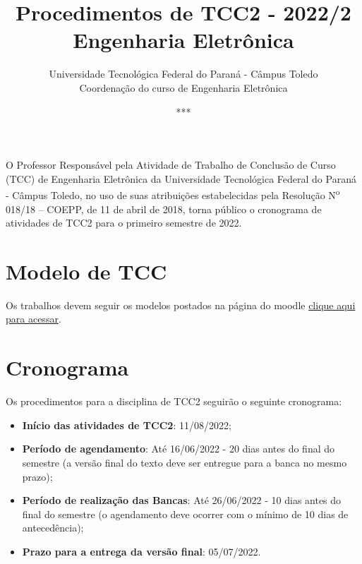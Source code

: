 \documentclass[a4paper, 12pt]{article}
\title{Procedimentos de TCC2 - 2022/2\\\textbf{Engenharia Eletrônica}}
\date{***}
\author{Universidade Tecnológica Federal do Paraná - Câmpus Toledo\\Coordenação do curso de Engenharia Eletrônica}
\newcommand{\utf}{Universidade Tecnológica Federal do Paraná - Câmpus Toledo}
\newcommand{\tcc}{Trabalho de Conclusão de Curso}
\begin{document}
    \maketitle
    
    O Professor Responsável pela Atividade de \tcc{ } (TCC) de Engenharia Eletrônica da \utf, no uso de suas atribuições estabelecidas pela Resolução N\textsuperscript{o} 018/18 – COEPP, de 11 de abril de 2018, torna público o cronograma de atividades de TCC2 para o primeiro semestre de 2022.


    

    \section{Modelo de TCC}
    Os trabalhos devem seguir os modelos postados na página do moodle \href{https://moodle.utfpr.edu.br/course/view.php?id=15669}{clique aqui para acessar}.
    
    \section{Cronograma}
    \label{sec:CRO}
    
    Os procedimentos para a disciplina de TCC2 seguirão o seguinte cronograma:
    \begin{itemize}
    	\item \textbf{Início das atividades de TCC2}: 11/08/2022;
    	\item \textbf{Período de agendamento}: Até 16/06/2022 - 20 dias antes do final do semestre (a versão final do texto deve ser entregue para a banca no mesmo prazo);
    	\item \textbf{Período de realização das Bancas}: Até 26/06/2022 - 10 dias antes do final do semestre (o agendamento deve ocorrer com o mínimo de 10 dias de antecedência);
    	\item \textbf{Prazo para a entrega da versão final}: 05/07/2022.
    \end{itemize}
\end{document}
